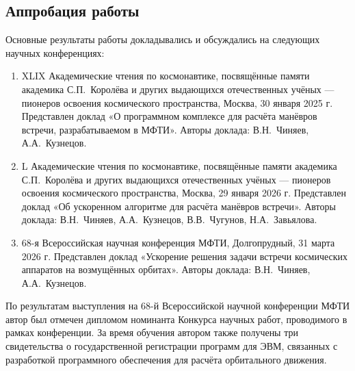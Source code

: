 \subsection{Аппробация работы}

Основные результаты работы докладывались и обсуждались на следующих научных конференциях:

\begin{enumerate}
\item XLIX Академические чтения по космонавтике, посвящённые памяти академика С.П.~Королёва и других выдающихся отечественных учёных --- пионеров освоения космического пространства, Москва, 30 января 2025 г. Представлен доклад «О программном комплексе для расчёта манёвров встречи, разрабатываемом в МФТИ». Авторы доклада: В.Н.~Чиняев, А.А.~Кузнецов.

\item L Академические чтения по космонавтике, посвящённые памяти академика С.П.~Королёва и других выдающихся отечественных учёных --- пионеров освоения космического пространства, Москва, 29 января 2026 г. Представлен доклад «Об ускоренном алгоритме для расчёта манёвров встречи». Авторы доклада: В.Н.~Чиняев, А.А.~Кузнецов, В.В.~Чугунов, Н.А.~Завьялова.

\item 68-я Всероссийская научная конференция МФТИ, Долгопрудный, 31 марта 2026 г. Представлен доклад «Ускорение решения задачи встречи космических аппаратов на возмущённых орбитах». Авторы доклада: В.Н.~Чиняев, А.А.~Кузнецов.
\end{enumerate}

По результатам выступления на 68-й Всероссийской научной конференции МФТИ автор был отмечен дипломом номинанта Конкурса научных работ, проводимого в рамках конференции. За время обучения автором также получены три свидетельства о государственной регистрации программ для ЭВМ, связанных с разработкой программного обеспечения для расчёта орбитального движения.



